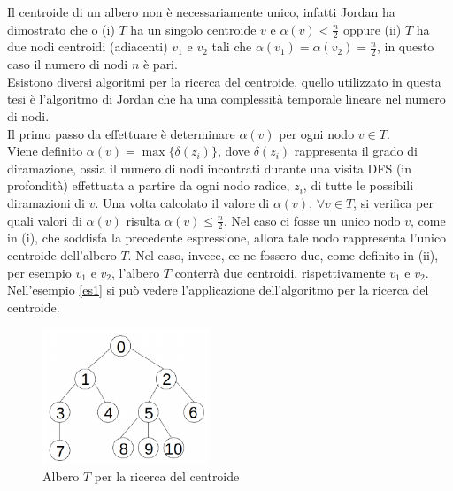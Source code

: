 Il centroide di un albero non \`e necessariamente unico, infatti Jordan \cite{jordan1869assemblages}  ha dimostrato che o (i) $ T $ ha un singolo centroide $ v $ e $\alpha(v) < \frac{n}{2}$ oppure (ii) $ T $ ha due nodi centroidi (adiacenti) $v_1$ e $v_2$ tali che $\alpha(v_1) = \alpha(v_2) = \frac{n}{2}$, in questo caso il numero di nodi $ n $ \`e pari.\\
Esistono diversi algoritmi per la ricerca del centroide, quello utilizzato in questa tesi \`e l'algoritmo di Jordan \cite{jordan1869assemblages} che  ha una complessit\`a temporale lineare nel numero di nodi. \\
Il primo passo da effettuare \`e determinare $\alpha(v)$ per ogni nodo $ v \in T$.\\
Viene definito $ \alpha(v) = \max\{\delta(z_i)\} $, dove $ \delta(z_i )$ rappresenta il grado di diramazione, ossia il numero di nodi incontrati durante una visita DFS (in profondit\`a) effettuata a partire da ogni nodo radice, $ z_i $, di tutte le possibili diramazioni di $ v $.
Una volta calcolato il valore di $ \alpha(v) $, $ \forall v \in T $, si verifica per quali valori di $ \alpha(v) $ risulta $\alpha(v)\le\frac{n}{2}$.
Nel caso ci fosse un unico nodo $ v $, come in (i), che soddisfa la precedente espressione, allora tale nodo rappresenta l'unico  centroide dell'albero $ T $.
Nel caso, invece, ce ne fossero due, come definito in (ii), per esempio $ v_1 $ e $ v_2 $,  l'albero $ T $ conterr\`a due centroidi, rispettivamente $ v_1 $ e $ v_2 $.\\
Nell'esempio \ref{es1} si pu\`o vedere l'applicazione dell'algoritmo per la ricerca del centroide.
	\begin{figure}[htbp]
		\centering
		\includegraphics[width=5cm]{capitolo3/grafo2}
		\caption{Albero $ T $  per la ricerca del centroide} 
		\label{fig:2}
\end{figure}
\mbox{}\\

